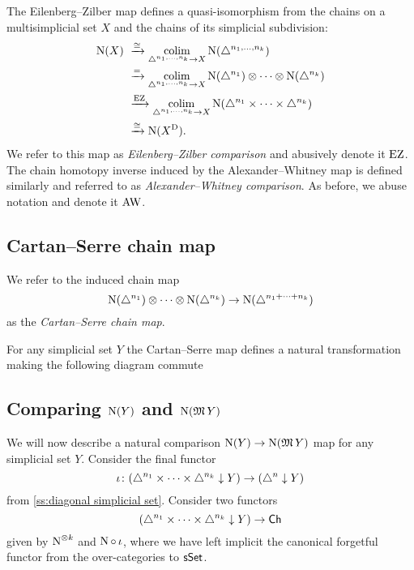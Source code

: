 The Eilenberg--Zilber map defines a quasi-isomorphism from the chains on a multisimplicial set $X$ and the chains of its simplicial subdivision:
\begin{equation} \label{e:ez comparison}
\begin{split}
\operatorname{N}(X) \ &\xrightarrow{\cong}
\operatorname*{colim}_{\triangle^{n_1, \dots, n_k} \to X} \operatorname{N} (\triangle^{n_1, \dots, n_k}) \\ &\xrightarrow{=}
\operatorname*{colim}_{\triangle^{n_1, \dots, n_k} \to X} \operatorname{N}(\triangle^{n_1}) \otimes \dotsb \otimes \operatorname{N}(\triangle^{n_k}) \\ &\xrightarrow{\operatorname{EZ}}
\operatorname*{colim}_{\triangle^{n_1, \dots, n_k} \to X} \operatorname{N}(\triangle^{n_1} \times \dots \times \triangle^{n_k}) \\ &\xrightarrow{\cong}
\operatorname{N}(X^{\operatorname{D}}).
\end{split}
\end{equation}
We refer to this map as \textit{Eilenberg--Zilber comparison} and abusively denote it $\operatorname{EZ}$.
The chain homotopy inverse induced by the Alexander--Whitney map is defined similarly and referred to as \textit{Alexander--Whitney comparison}.
As before, we abuse notation and denote it $\operatorname{AW}$.

\subsection{Cartan--Serre chain map}

We refer to the induced chain map
\[
\operatorname{N}(\triangle^{n_1}) \otimes \dotsb \otimes \operatorname{N}(\triangle^{n_k})
\to \operatorname{N}(\triangle^{n_1 + \dots + n_k})
\]
as the \textit{Cartan--Serre chain map}.

For any simplicial set $Y$ the Cartan--Serre map defines a natural transformation making the following diagram commute

\subsection{Comparing $\operatorname{N}(Y)$ and $\operatorname{N}(\operatorname{\mathfrak{M}} Y)$}

We will now describe a natural comparison $\operatorname{N}(Y) \to \operatorname{N}(\operatorname{\mathfrak{M}} Y)$ map for any simplicial set $Y$.
Consider the final functor
\[
\iota \colon (\triangle^{n_1} \times \dots \times \triangle^{n_k} \downarrow Y) \to (\triangle^{n} \downarrow Y)
\]
from \cref{ss:diagonal simplicial set}.
Consider two functors
\[
(\triangle^{n_1} \times \dots \times \triangle^{n_k} \downarrow Y) \to \mathsf{Ch}
\]
given by $\operatorname{N}^{\otimes k}$ and $\operatorname{N} \circ \, \iota$, where we have left implicit the canonical forgetful functor from the over-categories to $\mathsf{sSet}$.

